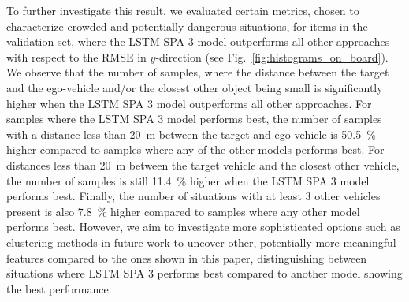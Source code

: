 To further investigate this result, we evaluated certain metrics, chosen to characterize crowded and potentially dangerous situations, for items in the validation set, where the \ac{LSTM} \ac{SPA} \num{3} model outperforms all other approaches with respect to the \ac{RMSE} in $y$-direction (see Fig.~\ref{fig:histograms_on_board}).
We observe that the number of samples, where the distance between the target and the ego-vehicle and/or the closest other object being small is significantly higher when the \ac{LSTM} \ac{SPA} \num{3} model outperforms all other approaches.
For samples where the \ac{LSTM} \ac{SPA} \num{3} model performs best, the number of samples with a distance less than \SI{20}{\meter} between the target and ego-vehicle is \SI{50.5}{\percent} higher compared to samples where any of the other models performs best.
For distances less than \SI{20}{\meter} between the target vehicle and the closest other vehicle, the number of samples is still \SI{11.4}{\percent} higher when the \ac{LSTM} \ac{SPA} \num{3} model performs best.
Finally, the number of situations with at least \num{3} other vehicles present is also \SI{7.8}{\percent} higher compared to samples where any other model performs best.
However, we aim to investigate more sophisticated options such as clustering methods in future work to uncover other, potentially more meaningful features compared to the ones shown in this paper, distinguishing between situations where \ac{LSTM} \ac{SPA} \num{3} performs best compared to another model showing the best performance.

